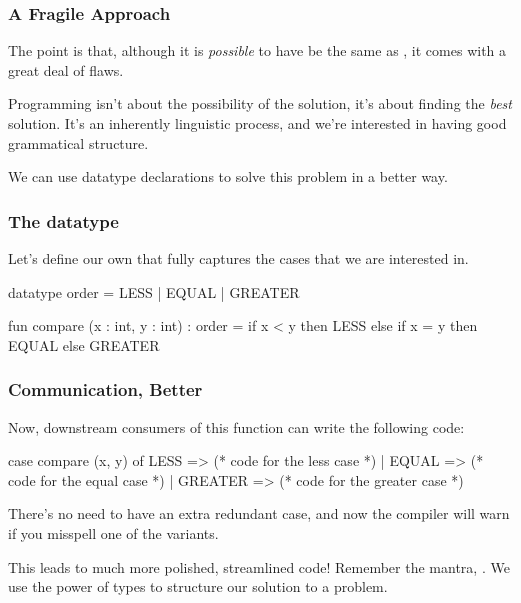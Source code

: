 \documentclass[aspectratio=169]{beamer}
\begin{document}
\begin{frame}[fragile]
  \frametitle{A Fragile Approach}

  The point is that, although it is \textit{possible} to have  be the
  same as , it comes with a great deal of flaws.

  \pause
  \vspace{\fill}

  Programming isn't about the possibility of the solution, it's about finding the
  \textit{best} solution. It's an inherently linguistic process, and we're interested
  in having good grammatical structure.

  \pause
  \vspace{\fill}

  We can use datatype declarations to solve this problem in a better way.
\end{frame}

\begin{frame}[fragile]
  \frametitle{The  datatype}

  Let's define our own  that fully captures the cases that
  we are interested in.

  \pause
  \vspace{\fill}

  \begin{codeblock}
    datatype order = LESS | EQUAL | GREATER

    fun compare (x : int, y : int) : order =
      if x < y then
        LESS
      else if x = y then
        EQUAL
      else
        GREATER
  \end{codeblock}
\end{frame}

\begin{frame}[fragile]
  \frametitle{Communication, Better}

  \tgs

  Now, downstream consumers of this function can write the following code:

  \pause
  \vspace{\fill}

  \begin{codeblock}
    case compare (x, y) of
      LESS => (* code for the less case *)
    | EQUAL => (* code for the equal case *)
    | GREATER => (* code for the greater case *)
  \end{codeblock}

  \pause
  \vspace{\fill}

  There's no need to have an extra redundant case, and now the compiler will
  warn if you misspell one of the variants.

  \pause
  \vspace{\fill}

  This leads to much more polished, streamlined code! Remember the mantra,
  . We use the power of types to structure our
  solution to a problem.
\end{frame}
\end{document}
